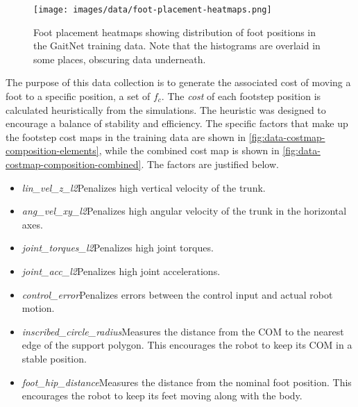 \begin{figure}[H]
  \centering
  \texttt{[image: images/data/foot-placement-heatmaps.png]}
  \caption{Foot placement heatmaps showing distribution of foot
    positions in the GaitNet training data. Note that the histograms
  are overlaid in some places, obscuring data underneath.}
  \label{fig:data-cn-training-distribution}
\end{figure}

The purpose of this data collection is to generate the associated cost of
moving a foot to a specific position, a set of $f_c$. The \textit{cost}
of each footstep position is calculated heuristically from the simulations.
The heuristic was designed to encourage a balance of stability and efficiency.
The specific factors that make up the footstep cost maps in the training data
are shown in \autoref{fig:data-costmap-composition-elements}, while the
combined cost map is shown in \autoref{fig:data-costmap-composition-combined}.
The factors are justified below.

\begin{itemize}
  \item \textit{lin\_vel\_z\_l2}\textemdash Penalizes high vertical
    velocity of the trunk.
  \item \textit{ang\_vel\_xy\_l2}\textemdash Penalizes high angular
    velocity of the trunk in
    the horizontal axes.
  \item \textit{joint\_torques\_l2}\textemdash Penalizes high joint torques.
  \item \textit{joint\_acc\_l2}\textemdash Penalizes high joint accelerations.
  \item \textit{control\_error}\textemdash Penalizes errors between the control
    input and actual robot motion.
  \item \textit{inscribed\_circle\_radius}\textemdash Measures the distance
    from the COM to the nearest edge of the support polygon. This
    encourages the robot to keep its COM in a stable position.
  \item \textit{foot\_hip\_distance}\textemdash Measures the distance from
    the nominal foot position. This encourages the robot to keep its feet
    moving along with the body.
\end{itemize}

